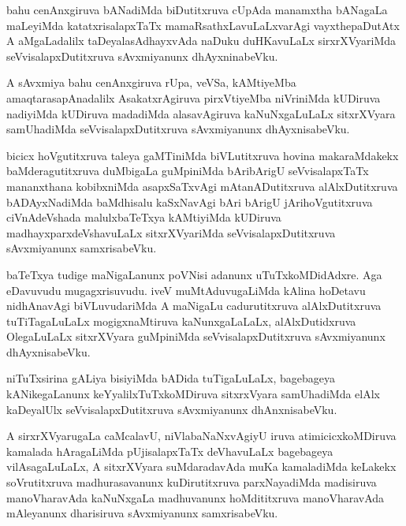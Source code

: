 \documentclass{article}
\begin{document}
\begin{mn}%
bahu cenAnxgiruva bANadiMda biDutitxruva cUpAda manamxtha bANagaLa maLeyiMda 
katatxrisalapxTaTx mamaRsathxLavuLaLxvarAgi vayxthepaDutAtx A aMgaLadalilx 
taDeyalasAdhayxvAda naDuku duHKavuLaLx sirxrXVyariMda seVvisalapxDutitxruva sAvxmiyanunx 
dhAyxninabeVku.
\end{mn}

\begin{mn}%
A sAvxmiya bahu cenAnxgiruva rUpa, veVSa, kAMtiyeMba amaqtarasapAnadalilx AsakatxrAgiruva 
pirxVtiyeMba niVriniMda kUDiruva nadiyiMda kUDiruva madadiMda alasavAgiruva 
kaNuNxgaLuLaLx sitxrXVyara samUhadiMda seVvisalapxDutitxruva sAvxmiyanunx dhAyxnisabeVku.
\end{mn}

\begin{mn}%
bicicx hoVgutitxruva taleya gaMTiniMda biVLutitxruva hovina  makaraMdakekx 
baMderagutitxruva duMbigaLa guMpiniMda bAribArigU seVvisalapxTaTx mananxthana kobibxniMda 
asapxSaTxvAgi mAtanADutitxruva alAlxDutitxruva bADAyxNadiMda baMdhisalu kaSxNavAgi bAri 
bArigU jArihoVgutitxruva ciVnAdeVshada malulxbaTeTxya kAMtiyiMda kUDiruva 
madhayxparxdeVshavuLaLx sitxrXVyariMda seVvisalapxDutitxruva sAvxmiyanunx samxrisabeVku.
\end{mn}

\begin{mn}%
baTeTxya tudige maNigaLanunx poVNisi adanunx uTuTxkoMDidAdxre. Aga eDavuvudu 
mugagxrisuvudu. iveV muMtAduvugaLiMda kAlina hoDetavu nidhAnavAgi biVLuvudariMda A 
maNigaLu cadurutitxruva alAlxDutitxruva tuTiTagaLuLaLx mogigxnaMtiruva kaNunxgaLaLaLx,
alAlxDutidxruva OlegaLuLaLx sitxrXVyara guMpiniMda seVvisalapxDutitxruva sAvxmiyanunx 
dhAyxnisabeVku.
\end{mn}

\begin{mn}%
niTuTxsirina gALiya bisiyiMda bADida tuTigaLuLaLx, bagebageya kANikegaLanunx 
keYyalilxTuTxkoMDiruva sitxrxVyara samUhadiMda elAlx kaDeyalUlx seVvisalapxDutitxruva 
sAvxmiyanunx dhAnxnisabeVku.
\end{mn}

\begin{mn}%
A sirxrXVyarugaLa caMcalavU, niVlabaNaNxvAgiyU iruva atimicicxkoMDiruva kamalada 
hAragaLiMda pUjisalapxTaTx deVhavuLaLx bagebageya vilAsagaLuLaLx, A sitxrXVyara 
suMdaradavAda muKa kamaladiMda keLakekx soVrutitxruva madhurasavanunx kuDirutitxruva 
parxNayadiMda madisiruva manoVharavAda kaNuNxgaLa madhuvanunx hoMdititxruva manoVharavAda 
mAleyanunx dharisiruva sAvxmiyanunx samxrisabeVku.
\end{mn}
\end{document}
